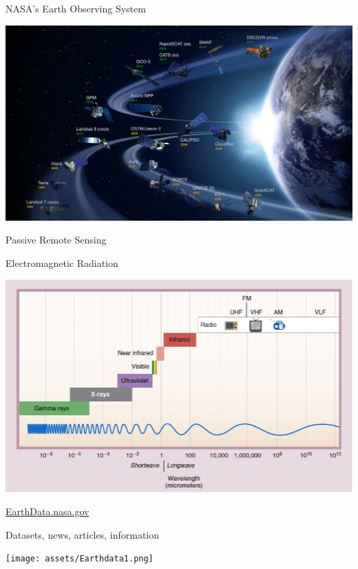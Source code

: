 \documentclass[ignorenonframetext,]{beamer}
\begin{document}
\begin{frame}{NASA's Earth Observing System}

\includegraphics{assets/eos.jpg}

\end{frame}

\begin{frame}{Passive Remote Sensing}

\begin{block}{Electromagnetic Radiation}

\includegraphics{assets/spectrum.png}

\end{block}

\end{frame}

\begin{frame}{\href{https://earthdata.nasa.gov}{EarthData.nasa.gov}}

Datasets, news, articles, information

\texttt{[image: assets/Earthdata1.png]}

\end{frame}
\end{document}
